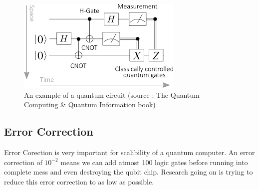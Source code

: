 \begin{figure}[!htb]
\centering
  \includegraphics{qcircuit}
  \caption{An example of a quantum circuit (source : The Quantum Computing \& Quantum Information book) }
\end{figure}

\subsection{Error Correction}
Error Corection is very important for scalibility of a quantum computer. An error correction of $10^{-2}$ means we can add atmost 100 logic gates before running into complete mess and even destroying the qubit chip. Research going on is trying to reduce this error correction to as low as possible.




